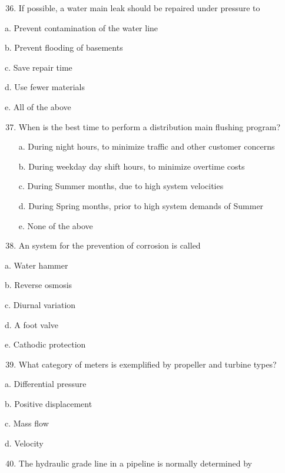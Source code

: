 \documentclass[10pt]{article}
\begin{document}
\begin{enumerate}
\begin{enumerate}
\begin{enumerate}
  \setcounter{enumi}{35}
  \item If possible, a water main leak should be repaired under pressure to
\end{enumerate}

a. Prevent contamination of the water line

b. Prevent flooding of basements

c. Save repair time

d. Use fewer materials

e. All of the above

\begin{enumerate}
  \setcounter{enumi}{36}
  \item When is the best time to perform a distribution main flushing program?


a. During night hours, to minimize traffic and other customer concerns

b. During weekday day shift hours, to minimize overtime costs

c. During Summer months, due to high system velocities

d. During Spring months, prior to high system demands of Summer

e. None of the above 

\item An system for the prevention of corrosion is called
\end{enumerate}
a. Water hammer

b. Reverse osmosis

c. Diurnal variation

d. A foot valve

e. Cathodic protection

\begin{enumerate}
  \setcounter{enumi}{38}
  \item What category of meters is exemplified by propeller and turbine types?
\end{enumerate}

a. Differential pressure

b. Positive displacement

c. Mass flow

d. Velocity

\begin{enumerate}
  \setcounter{enumi}{39}
  \item The hydraulic grade line in a pipeline is normally determined by
\end{enumerate}


\end{enumerate}
\end{enumerate}
\end{document}
